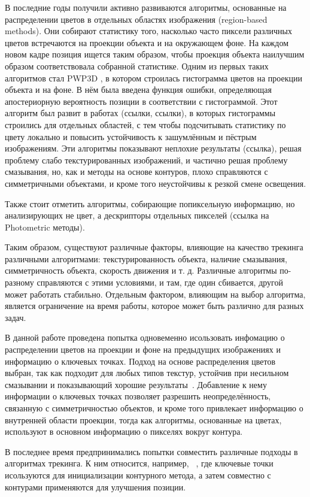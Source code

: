 В последние годы получили активно развиваются алгоритмы, основанные на распределении цветов в отдельных областях изображения (region-based methods). Они собирают статистику того, насколько часто пиксели различных цветов встречаются на проекции объекта и на окружающем фоне. На каждом новом кадре позиция ищется таким образом, чтобы проекция объекта наилучшим образом соответствовала собранной статистике. Одним из первых таких алгоритмов стал PWP3D \cite{PWP3D}, в котором строилась гистограмма цветов на проекции объекта и на фоне. В нём была введена функция ошибки, определяющая апостериорную вероятность позиции в соответствии с гистограммой. Этот алгоритм был развит в работах (ссылки, ссылки), в которых гистограммы строились для отдельных областей, с тем чтобы подсчитывать статистику по цвету локально и повысить устойчивость к зашумлённым и пёстрым изображениям. Эти алгоритмы показывают неплохие результаты (ссылка), решая проблему слабо текстурированных изображений, и частично решая проблему смазывания, но, как и методы на основе контуров, плохо справляются с симметричными объектами, и кроме того неустойчивы к резкой смене освещения. 

Также стоит отметить алгоритмы, собирающие попиксельную информацию, но анализирующих не цвет, а дескрипторы отдельных пикселей (ссылка на Photometric методы).

Таким образом, существуют различные факторы, влияющие на качество трекинга различными алгоритмами: текстурированность объекта, наличие смазывания, симметричность объекта, скорость движения и т. д. Различные алгоритмы по-разному справляются с этими условиями, и там, где один сбивается, другой может работать стабильно. Отдельным фактором, влияющим на выбор алгоритма, является ограничение на время работы, которое может быть различно для разных задач.

В данной работе проведена попытка одновеменно исользовать инфомацию о распределении цветов на проекции и фоне на предыдущих изображениях и информацию о ключевых точках. Подход на основе распределения цветов выбран, так как подходит для любых типов текстур, устойчив при несильном смазывании и показывающий хорошие результаты~\cite{Tjaden2018}. Добавление к нему информации о ключевых точках позволяет разрешить неопределённость, связанную с симметричностью объектов, и кроме того привлекает информацию о внутренней области проекции, тогда как алгоритмы, основанные на цветах, используют в основном информацию о пикселях вокруг контура.

В последнее время предпринимались попытки совместить различные подходы в алгоритмах трекинга. К ним относится, например, ~\cite{Bugaev_2018_ECCV}, где ключевые точки исользуются для инициализации контурного метода, а затем совместно с контурами применяются для улучшения позиции. 

